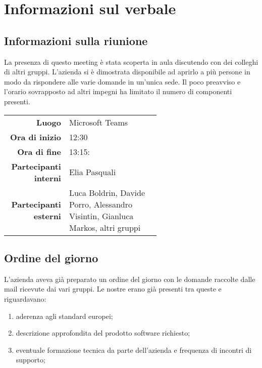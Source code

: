 \section{Informazioni sul verbale}

\subsection{Informazioni sulla riunione}
La presenza di questo meeting è stata scoperta in aula discutendo con dei colleghi di altri gruppi. L'azienda si è dimostrata disponibile ad aprirlo a più persone in modo da rispondere alle varie domande in un'unica sede. Il poco preavviso e l'orario sovrapposto ad altri impegni ha limitato il numero di componenti presenti. 

\begin{center}
	\begin{tabular}{r|p{0.6\linewidth}}
		\toprule
		\textbf{Luogo} & Microsoft Teams \\
		\textbf{Ora di inizio} & 12:30 \\
		\textbf{Ora di fine} & 13:15: \\
		\textbf{Partecipanti interni} & Elia Pasquali \\
		\textbf{Partecipanti esterni} & Luca Boldrin, Davide Porro, Alessandro Visintin, Gianluca Markos, altri gruppi
	\end{tabular}
\end{center}

\medskip

\subsection{Ordine del giorno}
L'azienda aveva già preparato un ordine del giorno con le domande raccolte dalle mail ricevute dai vari gruppi. Le nostre erano già presenti tra queste e riguardavano:
\begin{enumerate}
	\item aderenza agli standard europei;
	\item descrizione approfondita del prodotto software richiesto;
	\item eventuale formazione tecnica da parte dell'azienda e frequenza di incontri di supporto;
\end{enumerate}
